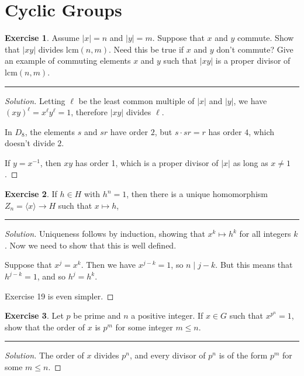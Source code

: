 \documentclass{article}
\theoremstyle{definition}
\newtheorem{exercise}{Exercise}
\begin{document}
\section*{Cyclic Groups}

\setcounter{exercise}{15}

\begin{exercise}
  Assume $|x| = n$ and $|y| = m$. Suppose that $x$ and $y$ commute. Show that $|xy|$ divides $\mathrm{lcm}(n,m)$. Need this be true if $x$ and $y$ don't commute? Give an example of commuting elements $x$ and $y$ such that $|xy|$ is a proper divisor of $\mathrm{lcm}(n,m)$.
\end{exercise}
\hrule
\begin{proof}[Solution]
  Letting $\ell$ be the least common multiple of $|x|$ and $|y|$, we have $(xy)^{\ell} = x^\ell y^\ell = 1$, therefore $|xy|$ divides $\ell$.

  In $D_8$, the elements $s$ and $sr$ have order $2$, but $s\cdot sr = r$ has order $4$, which doesn't divide $2$.

  If $y = x^{-1}$, then $xy$ has order 1, which is a proper divisor of $|x|$ as long as $x\ne 1$.
\end{proof}

\pagebreak

\setcounter{exercise}{17}

\begin{exercise}
  If $h\in H$ with $h^n = 1$, then there is a unique homomorphism $Z_n = \langle x\rangle\to H$ such that $x\mapsto h$,
\end{exercise}
\hrule
\begin{proof}[Solution]
  Uniqueness follows by induction, showing that $x^k\mapsto h^k$ for all integers $k$. Now we need to show that this is well defined.

  Suppose that $x^j = x^k$. Then we have $x^{j-k} = 1$, so $n\mid j-k$. But this means that $h^{j-k} = 1$, and so $h^j = h^k$.

  Exercise 19 is even simpler.
\end{proof}

\pagebreak

\setcounter{exercise}{19}

\begin{exercise}
  Let $p$ be prime and $n$ a positive integer. If $x\in G$ such that $x^{p^n} = 1$, show that the order of $x$ is $p^m$ for some integer $m\le n$.
\end{exercise}
\hrule
\begin{proof}[Solution]
  The order of $x$ divides $p^n$, and every divisor of $p^n$ is of the form $p^m$ for some $m\le n$.
\end{proof}
\end{document}
